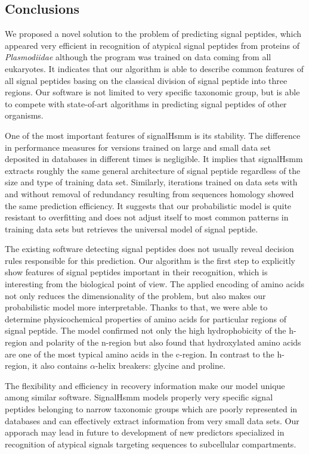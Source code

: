 \documentclass[10pt,letterpaper]{article}
\begin{document}
\subsection*{Conclusions}

We proposed a novel solution to the problem of predicting signal peptides, which appeared very efficient in recognition of atypical signal peptides from proteins of \textit{Plasmodiidae} although the program was trained on data coming from all eukaryotes. It indicates that our algorithm is able to describe common features of all signal peptides basing on the classical division of signal peptide into three regions. Our software is not limited to very specific taxonomic group, but is able to compete with state-of-art algorithms in predicting signal peptides of other organisms.

One of the most important features of signalHsmm is its stability. The difference in performance measures for versions trained on large and small data set deposited in databases in different times is negligible. It implies that signalHsmm extracts roughly the same general architecture of signal peptide regardless of the size and type of training data set. Similarly, iterations trained on data sets with and without removal of redundancy resulting from sequences homology showed the same prediction efficiency. It suggests that our probabilistic model is quite resistant to overfitting and does not adjust itself to most common patterns in training data sets but retrieves the universal model of signal peptide.

The existing software detecting signal peptides does not usually reveal decision rules responsible for this prediction. Our algorithm is the first step to explicitly show features of signal peptides important in their recognition, which is interesting from the biological point of view. The applied encoding of amino acids not only reduces the dimensionality of the problem, but also makes our probabilistic model more interpretable. Thanks to that, we were able to determine physicochemical properties of amino acids for particular regions of signal peptide. The model confirmed not only the high hydrophobicity of the h-region and polarity of the n-region but also found that hydroxylated amino acids are one of the most typical amino acids in the c-region. In contrast to the h-region, it also contains  $\alpha$-helix breakers: glycine and proline.

The flexibility and efficiency in recovery information make our model unique among similar software. SignalHsmm models properly very specific signal peptides belonging to narrow taxonomic groups which are poorly represented in databases and can effectively extract information from very small data sets. Our apporach may lead in future to development of new predictors specialized in recognition of atypical signals targeting sequences to subcellular compartments.
\end{document}
